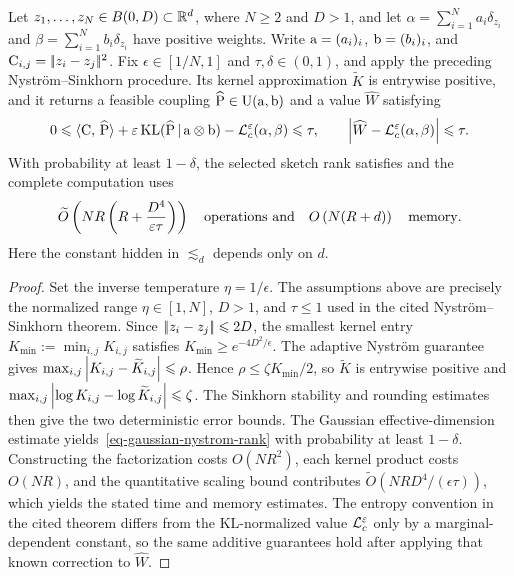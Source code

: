 \begin{prop}
\label{prop-gaussian-nystrom-sinkhorn-complexity}
Let \(z_1,\ldots,z_N\in B(0,D)\subset\mathbb{R}^d\), where \(N\geq2\) and \(D>1\), and let \(\alpha=\sum_{i=1}^N a_i\delta_{z_i}\) and \(\beta=\sum_{i=1}^N b_i\delta_{z_i}\) have positive weights. Write \(\mathrm{a}=(a_i)_i\), \(\mathrm{b}=(b_i)_i\), and \(\mathrm{C}_{i,j}=|\!| z_i-z_j |\!|^2\). Fix \(\epsilon\in[1/N,1]\) and \(\tau,\delta\in(0,1)\), and apply the preceding Nystr\"om--Sinkhorn procedure. Its kernel approximation \(\widetilde K\) is entrywise positive, and it returns a feasible coupling \(\widehat{\mathrm{P}}\in\mathrm{U}(\mathrm{a},\mathrm{b})\) and a value \(\widehat W\) satisfying
\[
	0\leqslant
		\langle \mathrm{C},\,\widehat{\mathrm{P}}\rangle
		+\varepsilon\operatorname{KL}(\widehat{\mathrm{P}}\,|\,\mathrm{a}\otimes\mathrm{b})
	-\mathcal{L}_c^\varepsilon(\alpha,\beta)
	\leqslant\tau,
	\qquad
	\left\lvert\widehat W-\mathcal{L}_c^\varepsilon(\alpha,\beta)\right\rvert\leqslant\tau.
\]
With probability at least \(1-\delta\), the selected sketch rank satisfies
and the complete computation uses
\[
	\widetilde O\left( 
		NR\left( R+\frac{D^4}{\varepsilon\tau} \right)
	 \right)
	\quad\text{operations and}\quad
	O\left( N(R+d) \right)
	\quad\text{memory}.
\]
Here the constant hidden in \(\lesssim_d\) depends only on \(d\).
\end{prop}

\begin{proof}
Set the inverse temperature \(\eta=1/\epsilon\). The assumptions above are precisely the normalized range \(\eta\in[1,N]\), \(D>1\), and \(\tau\leq1\) used in the cited Nystr\"om--Sinkhorn theorem. Since \(|\!| z_i-z_j |\!|\leqslant2D\), the smallest kernel entry \(K_{\min}:=\min_{i,j}K_{i,j}\) satisfies \(K_{\min}\geq e^{-4D^2/\epsilon}\). The adaptive Nystr\"om guarantee gives \(\max_{i,j}\left\lvert K_{i,j}-\widetilde K_{i,j}\right\rvert\leqslant\rho\). Hence \(\rho\leq\zeta K_{\min}/2\), so \(\widetilde K\) is entrywise positive and \(\max_{i,j}\left\lvert\log K_{i,j}-\log\widetilde K_{i,j}\right\rvert\leqslant\zeta\). The Sinkhorn stability and rounding estimates then give the two deterministic error bounds. The Gaussian effective-dimension estimate yields~\eqref{eq-gaussian-nystrom-rank} with probability at least \(1-\delta\). Constructing the factorization costs \(O(NR^2)\), each kernel product costs \(O(NR)\), and the quantitative scaling bound contributes \(\widetilde O(NRD^4/(\epsilon\tau))\), which yields the stated time and memory estimates. The entropy convention in the cited theorem differs from the KL-normalized value \(\mathcal{L}_c^\varepsilon\) only by a marginal-dependent constant, so the same additive guarantees hold after applying that known correction to \(\widehat W\).
\end{proof}

